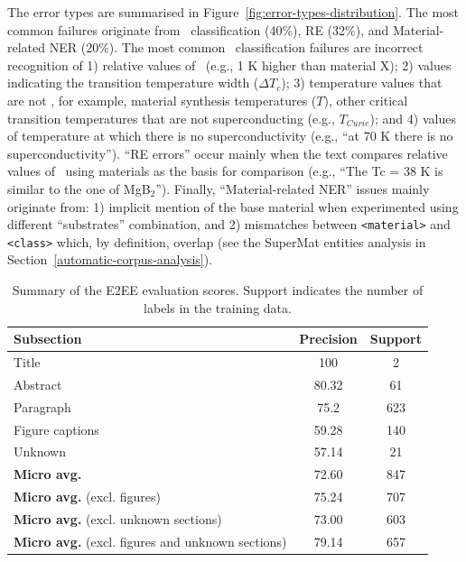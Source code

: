 The error types are summarised in Figure~\ref{fig:error-types-distribution}. The most common failures originate from \tc~classification (40\%), RE (32\%), and Material-related NER (20\%).
The most common \tc~classification failures are incorrect recognition of 1) relative values of \tc~(e.g., 1 K higher than material X); 2) values indicating the transition temperature width ($\Delta T_{c}$); 3) temperature values that are not \tc, for example, material synthesis temperatures ($T$), other critical transition temperatures that are not superconducting (e.g., $T_{Curie}$); and 4) values of temperature at which there is no superconductivity (e.g., ``at 70 K there is no superconductivity'').
``RE errors'' occur mainly when the text compares relative values of \tc~using materials as the basis for comparison (e.g., ``The Tc = 38 K is similar to the one of MgB$_{2}$'').
Finally, ``Material-related NER'' issues mainly originate from: 1) implicit mention of the base material when experimented using different ``substrates'' combination, and 2) mismatches between \texttt{<material>} and \texttt{<class>} which, by definition, overlap (see the SuperMat entities analysis in Section~\ref{automatic-corpus-analysis}).


\begin{table}[htbp]
    \centering
    \caption{Summary of the E2EE evaluation scores. Support indicates the number of labels in the training data.}
    \begin{tabular}{l c c}
        \toprule
        \textbf{Subsection}                                      & \textbf{Precision} & \textbf{Support} \\
        \midrule
        Title                                                    & 100                & 2                \\
        Abstract                                                 & 80.32              & 61               \\
        Paragraph                                                & 75.2               & 623              \\
        Figure captions                                          & 59.28              & 140              \\
        Unknown                                                  & 57.14              & 21               \\
        \midrule
        \textbf{Micro avg.}                                      & 72.60              & 847              \\
        \textbf{Micro avg.} (excl. figures)                      & 75.24              & 707              \\
        \textbf{Micro avg.} (excl. unknown sections)             & 73.00              & 603              \\
        \textbf{Micro avg.} (excl. figures and unknown sections) & 79.14              & 657              \\
        \bottomrule
    \end{tabular}
    
    \label{table:end2end-evaluation-summary}
\end{table}

